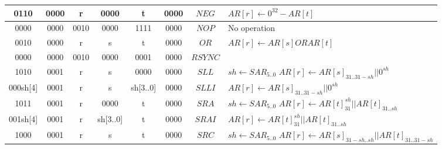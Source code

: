 \begin{longtable}{llllllllllllllllllllllll  p{1cm}  p{6cm} | }
		\multicolumn{4}{|c|}{0110} & \multicolumn{4}{c|}{0000} & \multicolumn{4}{c|}{r} & \multicolumn{4}{c|}{0000} & \multicolumn{4}{c|}{t} & \multicolumn{4}{c|}{0000} & \multicolumn{1}{c|}{$NEG$} & $AR[r] \leftarrow 0^{32}-AR[t]$ \\ \hline
		\multicolumn{4}{|c|}{0000} & \multicolumn{4}{c|}{0000} & \multicolumn{4}{c|}{0010} & \multicolumn{4}{c|}{0000} & \multicolumn{4}{c|}{1111} & \multicolumn{4}{c|}{0000} & \multicolumn{1}{c|}{$NOP$} &  No operation \\ \hline
        \multicolumn{4}{|c|}{0010} & \multicolumn{4}{c|}{0000} & \multicolumn{4}{c|}{r} & \multicolumn{4}{c|}{s} & \multicolumn{4}{c|}{t} & \multicolumn{4}{c|}{0000} & \multicolumn{1}{c|}{$OR$} & $AR[r] \leftarrow AR[s] OR AR[t]$ \\ \hline		\multicolumn{4}{|c|}{0000} & \multicolumn{4}{c|}{0000} & \multicolumn{4}{c|}{0010} & \multicolumn{4}{c|}{0000} & \multicolumn{4}{c|}{0001} & \multicolumn{4}{c|}{0000} & \multicolumn{1}{c|}{$RSYNC$} &  \\ \hline
        \multicolumn{4}{|c|}{1010} & \multicolumn{4}{c|}{0001} & \multicolumn{4}{c|}{r} & \multicolumn{4}{c|}{s} & \multicolumn{4}{c|}{0000} & \multicolumn{4}{c|}{0000} & \multicolumn{1}{c|}{$SLL$} & $sh \leftarrow SAR_{5..0}$ \newline $AR[r] \leftarrow AR[s]_{31..31-sh} || 0^{sh}$ \\ \hline
        \multicolumn{4}{|c|}{000sh[4]} & \multicolumn{4}{c|}{0001} & \multicolumn{4}{c|}{r} & \multicolumn{4}{c|}{s} & \multicolumn{4}{c|}{sh[3..0]} & \multicolumn{4}{c|}{0000} & \multicolumn{1}{c|}{$SLLI$} & $AR[r] \leftarrow AR[s]_{31..31-sh} || 0^{sh}$ \\ \hline
        \multicolumn{4}{|c|}{1011} & \multicolumn{4}{c|}{0001} & \multicolumn{4}{c|}{r} & \multicolumn{4}{c|}{0000} & \multicolumn{4}{c|}{t} & \multicolumn{4}{c|}{0000} & \multicolumn{1}{c|}{$SRA$} & $sh \leftarrow SAR_{5..0}$ \newline $AR[r] \leftarrow AR[t]_{31}^{sh} || AR[t]_{31..sh}$ \\ \hline
        \multicolumn{4}{|c|}{001sh[4]} & \multicolumn{4}{c|}{0001} & \multicolumn{4}{c|}{r} & \multicolumn{4}{c|}{sh[3..0]} & \multicolumn{4}{c|}{t} & \multicolumn{4}{c|}{0000} & \multicolumn{1}{c|}{$SRAI$} & $AR[r] \leftarrow AR[t]_{31}^{sh} || AR[t]_{31..sh}$ \\ \hline
        \multicolumn{4}{|c|}{1000} & \multicolumn{4}{c|}{0001} & \multicolumn{4}{c|}{r} & \multicolumn{4}{c|}{s} & \multicolumn{4}{c|}{t} & \multicolumn{4}{c|}{0000} & \multicolumn{1}{c|}{$SRC$} & $sh \leftarrow SAR_{5..0}$ \newline $AR[r] \leftarrow AR[s]_{31-sh..sh} || AR[t]_{31..31-sh}$ \\ \hline

\end{longtable}
